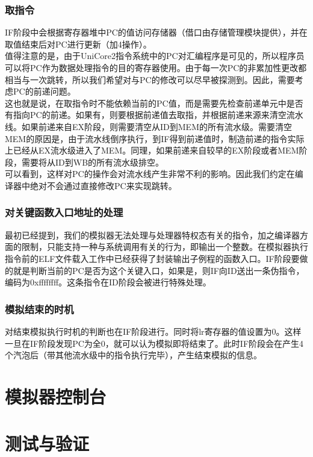 \documentclass[12pt,a4paper,Flow]{report}
\begin{document}
\subsection{取指令}
IF阶段中会根据寄存器堆中PC的值访问存储器（借口由存储管理模块提供），并在取值结束后对PC进行更新（加4操作）。\\
\indent 值得注意的是，由于UniCore2指令系统中的PC对汇编程序是可见的，所以程序员可以将PC作为数据处理指令的目的寄存器使用。由于每一次PC的非累加性更改都相当与一次跳转，所以我们希望对与PC的修改可以尽早被探测到。因此，需要考虑PC的前递问题。\\
\indent 这也就是说，在取指令时不能依赖当前的PC值，而是需要先检查前递单元中是否有指向PC的前递。如果有，则要根据前递值去取指，并根据前递来源来清空流水线。如果前递来自EX阶段，则需要清空从ID到MEM的所有流水级。需要清空MEM的原因是，由于流水线倒序执行，到IF得到前递值时，制造前递的指令实际上已经从EX流水级进入了MEM。同理，如果前递来自较早的EX阶段或者MEM阶段，需要将从ID到WB的所有流水级排空。\\
\indent 可以看到，这样对PC的操作会对流水线产生非常不利的影响。因此我们约定在编译器中绝对不会通过直接修改PC来实现跳转。
\subsection{对关键函数入口地址的处理}
最初已经提到，我们的模拟器无法处理与处理器特权态有关的指令，加之编译器方面的限制，只能支持一种与系统调用有关的行为，即输出一个整数。在模拟器执行指令前的ELF文件载入工作中已经获得了封装输出子例程的函数入口。IF阶段要做的就是判断当前的PC是否为这个关键入口，如果是，则IF向ID送出一条伪指令，编码为0xffffffff。这条指令在ID阶段会被进行特殊处理。
\subsection{模拟结束的时机}
对结束模拟执行时机的判断也在IF阶段进行。同时将lr寄存器的值设置为0。这样一旦在IF阶段发现PC为全0，就可以认为模拟即将结束了。此时IF阶段会在产生4个汽泡后（带其他流水级中的指令执行完毕），产生结束模拟的信息。

\chapter{模拟器控制台}

\chapter{测试与验证}
\end{document}
